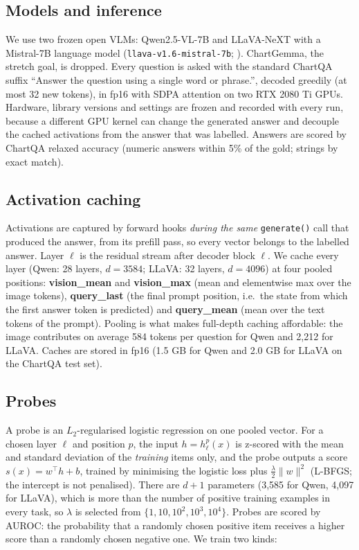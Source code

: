 \documentclass[11pt]{article}
\newcommand{\qwen}{Qwen2.5-VL-7B\xspace}
\begin{document}
\subsection{Models and inference}
We use two frozen open VLMs: \qwen \citep{bai2025qwen25vl} and LLaVA-NeXT with
a Mistral-7B language model (\texttt{llava-v1.6-mistral-7b};
\citealp{liu2024llavanext}). ChartGemma, the stretch goal, is dropped. Every
question is asked with the standard ChartQA suffix ``Answer the question using a
single word or phrase.'', decoded greedily (at most 32 new tokens), in fp16 with
SDPA attention on two RTX 2080 Ti GPUs. Hardware, library versions and settings
are frozen and recorded with every run, because a different GPU kernel can
change the generated answer and decouple the cached activations from the answer
that was labelled. Answers are scored by ChartQA relaxed accuracy (numeric
answers within 5\% of the gold; strings by exact match).

\subsection{Activation caching}
Activations are captured by forward hooks \emph{during the same} \texttt{generate()}
call that produced the answer, from its prefill pass, so every vector belongs to
the labelled answer. Layer $\ell$ is the residual stream after decoder block
$\ell$. We cache every layer (Qwen: 28 layers, $d=3584$; LLaVA: 32 layers,
$d=4096$) at four pooled positions: \textbf{vision\_mean} and
\textbf{vision\_max} (mean and elementwise max over the image tokens),
\textbf{query\_last} (the final prompt position, i.e.\ the state from which the
first answer token is predicted) and \textbf{query\_mean} (mean over the text
tokens of the prompt). Pooling is what makes full-depth caching affordable: the
image contributes on average 584 tokens per question for Qwen and 2,212 for
LLaVA. Caches are stored in fp16 (1.5 GB for Qwen and 2.0 GB for LLaVA on the
ChartQA test set).

\subsection{Probes}
\label{sec:probes}
A probe is an $L_2$-regularised logistic regression on one pooled vector. For a
chosen layer $\ell$ and position $p$, the input $h=h_\ell^p(x)$ is z-scored with
the mean and standard deviation of the \emph{training} items only, and the probe
outputs a score $s(x)=w^{\top}h+b$, trained by minimising the logistic loss plus
$\tfrac{\lambda}{2}\lVert w\rVert^2$ (L-BFGS; the intercept is not penalised).
There are $d+1$ parameters (3,585 for Qwen, 4,097 for LLaVA), which is more than
the number of positive training examples in every task, so $\lambda$ is
selected from $\{1,10,10^2,10^3,10^4\}$. Probes are scored by AUROC: the
probability that a randomly chosen positive item receives a higher score than a
randomly chosen negative one. We train two kinds:
\end{document}
